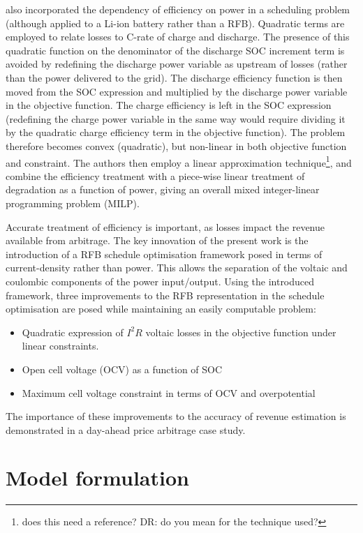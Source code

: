 \documentclass[preprint,3p,review,authoryear,10pt]{elsarticle}
\newcommand{\sol}[1]{\footnote{#1}\marginpar{\fbox{\thefootnote}}}
\begin{document}
\cite{Sarker2017} also incorporated the dependency of efficiency on power in a scheduling problem (although applied to a Li-ion battery rather than a RFB). Quadratic terms are employed to relate losses to C-rate of charge and discharge. The presence of this quadratic function on the denominator of the discharge SOC increment term is avoided by redefining the discharge power variable as upstream of losses (rather than the power delivered to the grid). The discharge efficiency function is then moved from the SOC expression and multiplied by the discharge power variable in the objective function. The charge efficiency is left in the SOC expression (redefining the charge power variable in the same way would require dividing it by the quadratic charge efficiency term in the objective function). The problem therefore becomes convex (quadratic), but non-linear in both objective function and constraint. The authors then employ a linear approximation technique\sol{does this need a reference? DR: do you mean for the technique used?}, and combine the efficiency treatment with a piece-wise linear treatment of degradation as a function of power, giving an overall mixed integer-linear programming problem (MILP). 

Accurate treatment of efficiency is important, as losses impact the revenue available from arbitrage. The key innovation of the present work is the introduction of a RFB schedule optimisation framework posed in terms of current-density rather than power. This allows the separation of the voltaic and coulombic components of the power input/output. Using the introduced framework, three improvements to the RFB representation in the schedule optimisation are posed while maintaining an easily computable problem:

\begin{itemize}
    \item Quadratic expression of $I^2R$ voltaic losses in the objective function under linear constraints.
    \item Open cell voltage (OCV) as a function of SOC
    \item Maximum cell voltage constraint in terms of OCV and overpotential
\end{itemize}

The importance of these improvements to the accuracy of revenue estimation is demonstrated in a day-ahead price arbitrage case study. 


\section{Model formulation}
\label{sec:Model_Formulation}
\end{document}

